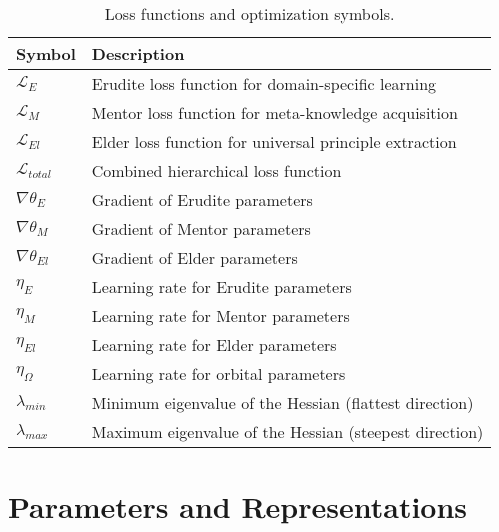 \begin{table}[h]
\centering
\begin{tabular}{|l|p{10cm}|}
\hline
\textbf{Symbol} & \textbf{Description} \\
\hline
$\mathcal{L}_E$ & Erudite loss function for domain-specific learning \\
\hline
$\mathcal{L}_M$ & Mentor loss function for meta-knowledge acquisition \\
\hline
$\mathcal{L}_{El}$ & Elder loss function for universal principle extraction \\
\hline
$\mathcal{L}_{total}$ & Combined hierarchical loss function \\
\hline
$\nabla \theta_E$ & Gradient of Erudite parameters \\
\hline
$\nabla \theta_M$ & Gradient of Mentor parameters \\
\hline
$\nabla \theta_{El}$ & Gradient of Elder parameters \\
\hline
$\eta_E$ & Learning rate for Erudite parameters \\
\hline
$\eta_M$ & Learning rate for Mentor parameters \\
\hline
$\eta_{El}$ & Learning rate for Elder parameters \\
\hline
$\eta_{\Omega}$ & Learning rate for orbital parameters \\
\hline
$\lambda_{min}$ & Minimum eigenvalue of the Hessian (flattest direction) \\
\hline
$\lambda_{max}$ & Maximum eigenvalue of the Hessian (steepest direction) \\
\hline
\end{tabular}
\caption{Loss functions and optimization symbols.}
\label{tab:symbols_loss}
\end{table}

\section{Parameters and Representations}

